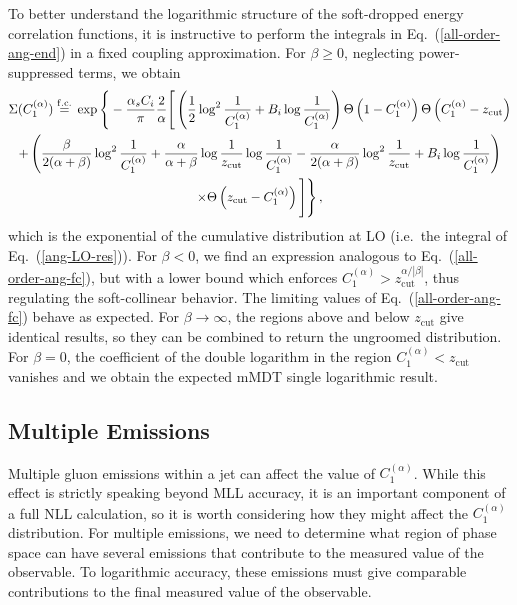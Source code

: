 \documentclass[letterpaper,11pt]{article}
\newcommand{\wideeq}[1]{\makebox[{#1}]{$=$}}
\newcommand{\as}{\alpha_s}
\newcommand{\C}[2]{C^{(#2)}_{#1}}
\newcommand{\zcut}{z_\text{cut}}
\newcommand{\ea}{{\C{1}{\alpha}}}
\DeclareRobustCommand{\Eq}[1]{Eq.~(\ref{#1})}
\begin{document}
To better understand the logarithmic structure of the soft-dropped energy correlation functions, it is instructive to perform the integrals in \Eq{all-order-ang-end} in a fixed coupling approximation. For $\beta \ge 0$, neglecting power-suppressed terms, we obtain \newpage
\begin{multline}\label{all-order-ang-fc}
\Sigma(\ea)
 \overset{\rm f.c.}{\wideeq{0.6cm}}
\exp \Bigg\{- \frac{\as C_i}{\pi}\frac{2}{\alpha}
\Bigg[ \left( \frac{1}{2}\log^2 \frac{1}{\ea}+ B_i \log\frac{1}{\ea} \right) \Theta\left(1- \ea \right)  \Theta\left(\ea - \zcut \right)  \\
+
\left( \frac{\beta}{2(\alpha+\beta)} \log^2 \frac{1}{\ea}+ \frac{\alpha}{\alpha+\beta}\log \frac{1}{\zcut} \log\frac{1}{\ea}-\frac{\alpha}{2(\alpha+\beta)} \log^2 \frac{1}{\zcut} +B_i \log\frac{1}{\ea}\right) \\ \times \Theta\left(\zcut-\ea \right)  
\Bigg] \Bigg\}  \,,
\end{multline}
which is the exponential of the cumulative distribution at LO (i.e.\ the integral of \Eq{ang-LO-res}).  For $\beta < 0$, we find an expression analogous to \Eq{all-order-ang-fc}, but with a lower bound which enforces $\C{1}{\alpha} > \zcut^{\alpha/|\beta|}$, thus regulating the soft-collinear behavior.  The limiting values of \Eq{all-order-ang-fc} behave as expected.  For $\beta \to \infty$, the regions above and below $\zcut$ give identical results, so they can be combined to return the ungroomed distribution. For $\beta=0$, the coefficient of the double logarithm in the region $\ea<\zcut$ vanishes and we obtain the expected mMDT single logarithmic result. 

\subsection{Multiple Emissions}
\label{sec:pme}


Multiple gluon emissions within a jet can affect the value of $\ea$. While this effect is strictly speaking beyond MLL accuracy, it is an important component of a full NLL calculation, so it is worth considering how they might affect the $\ea$ distribution.  For multiple emissions, we need to determine what region of phase space can have several emissions that contribute to the measured value of the observable.  To logarithmic accuracy, these emissions must give comparable contributions to the final measured value of the observable.
\end{document}
